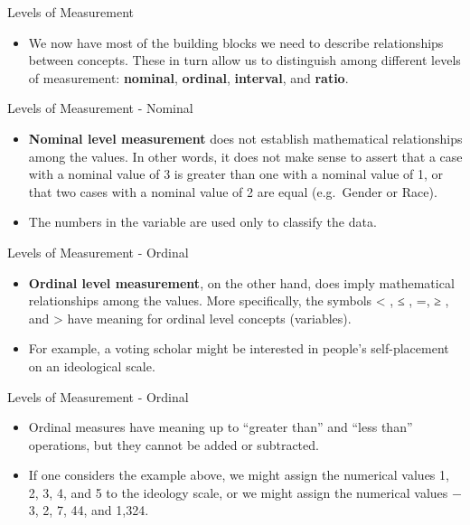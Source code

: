 \documentclass[
  ignorenonframetext,
]{beamer}
\providecommand{\tightlist}{%
  \setlength{\itemsep}{0pt}\setlength{\parskip}{0pt}}
\begin{document}
\begin{frame}{Levels of Measurement}
\protect\hypertarget{levels-of-measurement}{}

\begin{itemize}
\tightlist
\item
  We now have most of the building blocks we need to describe
  relationships between concepts. These in turn allow us to distinguish
  among different levels of measurement: \textbf{nominal},
  \textbf{ordinal}, \textbf{interval}, and \textbf{ratio}.
\end{itemize}

\end{frame}

\begin{frame}{Levels of Measurement - Nominal}
\protect\hypertarget{levels-of-measurement---nominal}{}

\begin{itemize}
\item
  \textbf{Nominal level measurement} does not establish mathematical
  relationships among the values. In other words, it does not make sense
  to assert that a case with a nominal value of 3 is greater than one
  with a nominal value of 1, or that two cases with a nominal value of 2
  are equal (e.g.~Gender or Race).
\item
  The numbers in the variable are used only to classify the data.
\end{itemize}

\end{frame}

\begin{frame}{Levels of Measurement - Ordinal}
\protect\hypertarget{levels-of-measurement---ordinal}{}

\begin{itemize}
\item
  \textbf{Ordinal level measurement}, on the other hand, does imply
  mathematical relationships among the values. More specifically, the
  symbols \textless{} , ≤ , =, ≥ , and \textgreater{} have meaning for
  ordinal level concepts (variables).
\item
  For example, a voting scholar might be interested in people's
  self-placement on an ideological scale.
\end{itemize}

\end{frame}

\begin{frame}{Levels of Measurement - Ordinal}
\protect\hypertarget{levels-of-measurement---ordinal-1}{}

\begin{itemize}
\item
  Ordinal measures have meaning up to ``greater than'' and ``less than''
  operations, but they cannot be added or subtracted.
\item
  If one considers the example above, we might assign the numerical
  values 1, 2, 3, 4, and 5 to the ideology scale, or we might assign the
  numerical values − 3, 2, 7, 44, and 1,324.
\end{itemize}

\end{frame}
\end{document}
